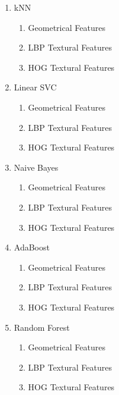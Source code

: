 \documentclass[11pt]{article}
\providecommand{\tightlist}{%
      \setlength{\itemsep}{0pt}\setlength{\parskip}{0pt}}
\begin{document}
\begin{enumerate}
\def\labelenumi{\arabic{enumi}.}
\tightlist
\item
  kNN

  \begin{enumerate}
  \def\labelenumii{\arabic{enumii}.}
  \tightlist
  \item
    Geometrical Features
  \item
    LBP Textural Features
  \item
    HOG Textural Features
  \end{enumerate}
\item
  Linear SVC

  \begin{enumerate}
  \def\labelenumii{\arabic{enumii}.}
  \tightlist
  \item
    Geometrical Features
  \item
    LBP Textural Features
  \item
    HOG Textural Features
  \end{enumerate}
\item
  Naive Bayes

  \begin{enumerate}
  \def\labelenumii{\arabic{enumii}.}
  \tightlist
  \item
    Geometrical Features
  \item
    LBP Textural Features
  \item
    HOG Textural Features
  \end{enumerate}
\item
  AdaBoost

  \begin{enumerate}
  \def\labelenumii{\arabic{enumii}.}
  \tightlist
  \item
    Geometrical Features
  \item
    LBP Textural Features
  \item
    HOG Textural Features
  \end{enumerate}
\item
  Random Forest

  \begin{enumerate}
  \def\labelenumii{\arabic{enumii}.}
  \tightlist
  \item
    Geometrical Features
  \item
    LBP Textural Features
  \item
    HOG Textural Features
  \end{enumerate}
\end{enumerate}
\end{document}
